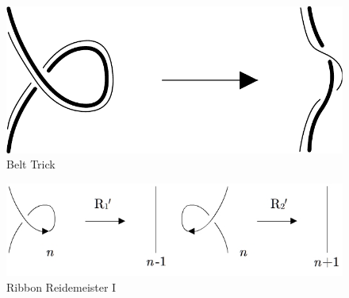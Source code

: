 \begin{figure}[tb]
\centering
\includegraphics[scale=.6]{graphics/belt-trick}
\caption{Belt Trick}
\label{belt trick}
\end{figure}

\begin{figure}[tb]
\centering
\includegraphics[scale=.6]{graphics/ribbon-reidemeister-I}
\caption{Ribbon Reidemeister I}
\label{ribbon reidemeister I}
\end{figure}

